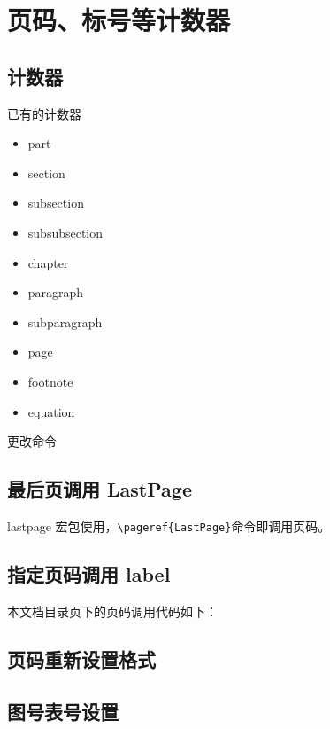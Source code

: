 \section{页码、标号等计数器}
\subsection{计数器}
已有的计数器
\begin{itemize}
  \item part  \item section  \item subsection \item subsubsection
  \item chapter \item paragraph \item subparagraph \item page \item footnote
  \item equation
\end{itemize}
更改命令
\begin{latexcmd}
  \setcounter{计数器名称}{数字}  %
  \addtocounter{计数器名称}{数字} %
\end{latexcmd}

\subsection{最后页调用 LastPage}
lastpage 宏包使用，\verb|\pageref{LastPage}|命令即调用页码。

\subsection{指定页码调用 label}
本文档目录页下的页码调用代码如下：
\begin{latexcmd}
\label{page_menu} %
\fancyfoot[C]{\textcolor[rgb]{0.00,0.59,0.00}{\thepage}/\pageref{LastPage}}

\end{latexcmd}
\subsection{页码重新设置格式}
\begin{latexcmd}
\end{latexcmd}
\subsection{图号表号设置}
\begin{latexcmd}
\renewcommand*\figurename{}
\renewcommand*\tablename{}
\renewcommand\thefigure{图 \arabic{chapter}-\arabic{figure}~}
\renewcommand\thetable{表 \arabic{chapter}-\arabic{table}~}
\end{latexcmd}
